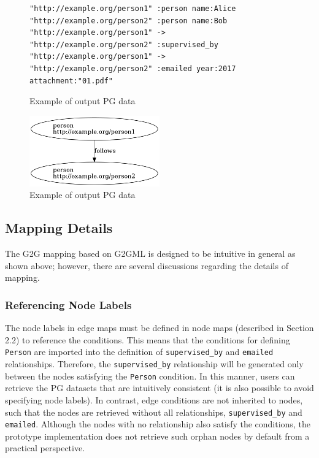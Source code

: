 \documentclass[runningheads]{llncs}
\begin{document}
\begin{figure}[!t]
\begin{scriptsize}
\begin{verbatim}
"http://example.org/person1" :person name:Alice
"http://example.org/person2" :person name:Bob
"http://example.org/person1" -> "http://example.org/person2" :supervised_by
"http://example.org/person1" -> "http://example.org/person2" :emailed year:2017 attachment:"01.pdf"
\end{verbatim}
\end{scriptsize}
\caption{Example of output PG data}
\label{fig:example-pg}
\end{figure}


\begin{figure}
\center
\includegraphics[width=0.5\textwidth]{pg_example5.png}
\caption{Example of output PG data}
\label{fig:pg_example5}
\end{figure}

\subsection{Mapping Details}
\label{subsec:mapping-details}
The G2G mapping based on G2GML is designed to be intuitive in general as shown above; however, there are several discussions regarding the details of mapping.

\subsubsection{Referencing Node Labels}
The node labels in edge maps must be defined in node maps (described in Section 2.2) to reference the conditions. This means that the conditions for defining \texttt{Person} are imported into the definition of \texttt{supervised\_by} and \texttt{emailed} relationships. Therefore, the \texttt{supervised\_by} relationship will be generated only between the nodes satisfying the \texttt{Person} condition. In this manner, users can retrieve the PG datasets that are intuitively consistent (it is also possible to avoid specifying node labels). In contrast, edge conditions are not inherited to nodes, such that the nodes are retrieved without all relationships, \texttt{supervised\_by} and \texttt{emailed}. Although the nodes with no relationship also satisfy the conditions, the prototype implementation does not retrieve such orphan nodes by default from a practical perspective.
\end{document}
